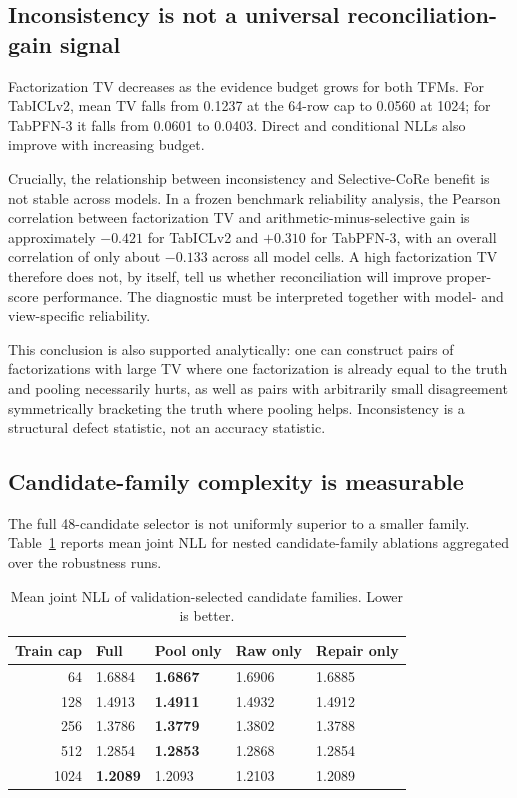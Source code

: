 \documentclass[a4paper,fleqn]{cas-sc}
\begin{document}
\subsection{Inconsistency is not a universal reconciliation-gain signal}
Factorization TV decreases as the evidence budget grows for both TFMs. For TabICLv2, mean TV falls from 0.1237 at the 64-row cap to 0.0560 at 1024; for TabPFN-3 it falls from 0.0601 to 0.0403. Direct and conditional NLLs also improve with increasing budget.

Crucially, the relationship between inconsistency and Selective-CoRe benefit is not stable across models. In a frozen benchmark reliability analysis, the Pearson correlation between factorization TV and arithmetic-minus-selective gain is approximately $-0.421$ for TabICLv2 and $+0.310$ for TabPFN-3, with an overall correlation of only about $-0.133$ across all model cells. A high factorization TV therefore does not, by itself, tell us whether reconciliation will improve proper-score performance. The diagnostic must be interpreted together with model- and view-specific reliability.

This conclusion is also supported analytically: one can construct pairs of factorizations with large TV where one factorization is already equal to the truth and pooling necessarily hurts, as well as pairs with arbitrarily small disagreement symmetrically bracketing the truth where pooling helps. Inconsistency is a structural defect statistic, not an accuracy statistic.

\subsection{Candidate-family complexity is measurable}
The full 48-candidate selector is not uniformly superior to a smaller family. Table~\ref{tab:families} reports mean joint NLL for nested candidate-family ablations aggregated over the robustness runs.

\begin{table}
\centering
\caption{Mean joint NLL of validation-selected candidate families. Lower is better.}
\label{tab:families}
\begin{tabular}{rllll}
\toprule
Train cap & Full & Pool only & Raw only & Repair only\\
\midrule
64 & 1.6884 & \textbf{1.6867} & 1.6906 & 1.6885\\
128 & 1.4913 & \textbf{1.4911} & 1.4932 & 1.4912\\
256 & 1.3786 & \textbf{1.3779} & 1.3802 & 1.3788\\
512 & 1.2854 & \textbf{1.2853} & 1.2868 & 1.2854\\
1024 & \textbf{1.2089} & 1.2093 & 1.2103 & 1.2089\\
\bottomrule
\end{tabular}
\end{table}
\end{document}
